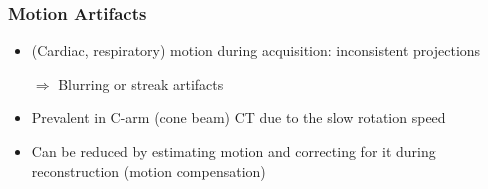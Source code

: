 \begin{frame}
	\frametitle{Motion Artifacts}

	\begin{itemize}
		\setlength\itemsep{0.3cm}
		\item (Cardiac, respiratory) motion during acquisition: inconsistent projections
		\item[$\Rightarrow$] Blurring or streak artifacts
		\item Prevalent in C-arm (cone beam) CT due to the slow rotation speed
		\item Can be reduced by estimating motion and correcting for it during reconstruction (motion compensation)

	\end{itemize}

\end{frame}


